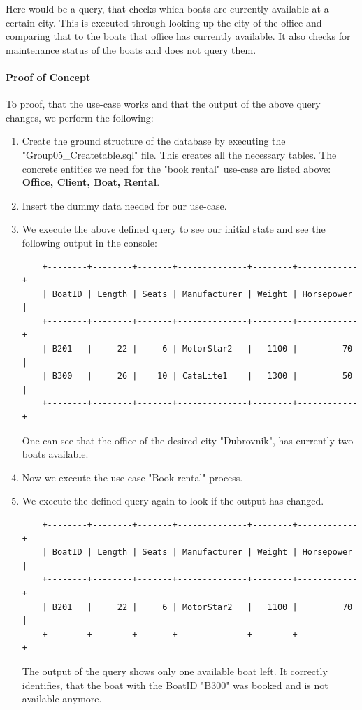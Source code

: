 \documentclass[a4paper, 11pt]{article}          %
\begin{document}
\noindent
Here would be a query, that checks which boats are currently available at a certain city. This is executed through looking up the city of the office and comparing that to the boats that office has currently available. It also checks for maintenance status of the boats and does not query them.

\paragraph*{Proof of Concept }
\noindent
To proof, that the use-case works and that the output of the above query changes, we perform the following:
\noindent
\begin{enumerate}[label=\textbf{Step \arabic*}:, leftmargin=*]
    \item Create the ground structure of the database by executing the "Group05\_Createtable.sql" file. This creates all the necessary tables. The concrete entities we need for the "book rental" use-case are listed above: \textbf{Office, Client, Boat, Rental}.
    \item Insert the dummy data needed for our use-case.
    \item We execute the above defined query to see our initial state and see the following output in the console:
    \begin{lstlisting}
    +--------+--------+-------+--------------+--------+------------+
    | BoatID | Length | Seats | Manufacturer | Weight | Horsepower |
    +--------+--------+-------+--------------+--------+------------+
    | B201   |     22 |     6 | MotorStar2   |   1100 |         70 |
    | B300   |     26 |    10 | CataLite1    |   1300 |         50 |
    +--------+--------+-------+--------------+--------+------------+
    \end{lstlisting}
    One can see that the office of the desired city "Dubrovnik", has currently two boats available.
    \item Now we execute the use-case "Book rental" process.
    \newpage
    \item We execute the defined query again to look if the output has changed.
    \begin{lstlisting}
    +--------+--------+-------+--------------+--------+------------+
    | BoatID | Length | Seats | Manufacturer | Weight | Horsepower |
    +--------+--------+-------+--------------+--------+------------+
    | B201   |     22 |     6 | MotorStar2   |   1100 |         70 |
    +--------+--------+-------+--------------+--------+------------+
    \end{lstlisting}
    The output of the query shows only one available boat left. It correctly identifies, that the boat with the BoatID "B300" was booked and is not available anymore.
\end{enumerate}
\end{document}
